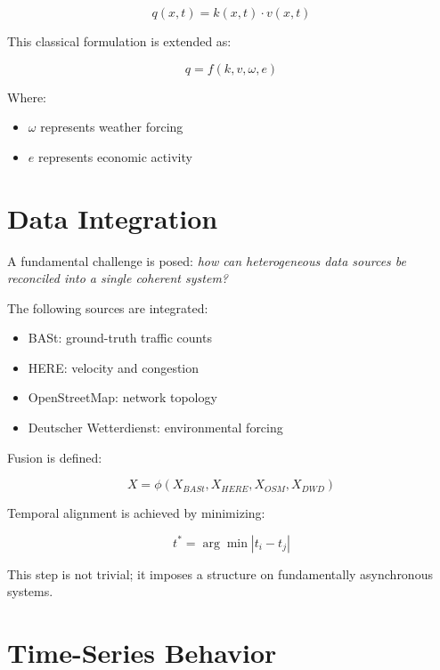 \documentclass[12pt]{article}
\begin{document}
\begin{equation}
q(x,t) = k(x,t) \cdot v(x,t)
\end{equation}

This classical formulation is extended as:

\begin{equation}
q = f(k, v, \omega, e)
\end{equation}

Where:
\begin{itemize}
\item $\omega$ represents weather forcing
\item $e$ represents economic activity
\end{itemize}

\section{Data Integration}

A fundamental challenge is posed: \textit{how can heterogeneous data sources be reconciled into a single coherent system?}

The following sources are integrated:

\begin{itemize}
\item BASt: ground-truth traffic counts
\item HERE: velocity and congestion
\item OpenStreetMap: network topology
\item Deutscher Wetterdienst: environmental forcing
\end{itemize}

Fusion is defined:

\begin{equation}
X = \phi(X_{BASt}, X_{HERE}, X_{OSM}, X_{DWD})
\end{equation}

Temporal alignment is achieved by minimizing:

\begin{equation}
t^* = \arg\min |t_i - t_j|
\end{equation}

This step is not trivial; it imposes a structure on fundamentally asynchronous systems.

\section{Time-Series Behavior}
\end{document}
